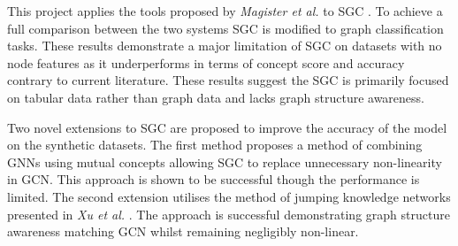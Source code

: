 This project applies the tools proposed by \textit{Magister et al.} \cite{magister2021gcexplainer} to SGC \cite{wu2019simplifying}.
To achieve a full comparison between the two systems SGC is modified to graph classification tasks.
These results demonstrate a major limitation of SGC on datasets with no node features as it underperforms in terms of concept score and accuracy contrary to current literature.
These results suggest the SGC is primarily focused on tabular data rather than graph data and lacks graph structure awareness.

Two novel extensions to SGC are proposed to improve the accuracy of the model on the synthetic datasets.
The first method proposes a method of combining GNNs using mutual concepts allowing SGC to replace unnecessary non-linearity in GCN.
This approach is shown to be successful though the performance is limited.
The second extension utilises the method of jumping knowledge networks presented in \textit{Xu et al.} \cite{xu2018representation}.
The approach is successful demonstrating graph structure awareness matching GCN whilst remaining negligibly non-linear.











